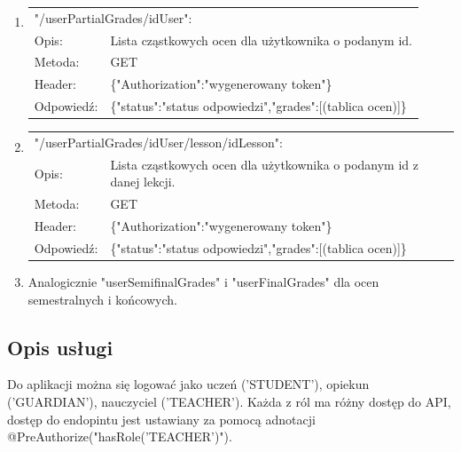 \documentclass[12pt, titlepage]{article}
\begin{document}
\begin{enumerate}
	\item 
	{\renewcommand{\arraystretch}{1.5}
	\begin{tabular}[t]{p{3cm} p{15cm}}
	\multicolumn{2}{l}{"/userPartialGrades/{idUser}":} \\
	Opis: &  Lista cząstkowych ocen dla użytkownika o podanym id. \\
	Metoda: & GET \\
	Header: & \{"Authorization":"wygenerowany token"\} \\
	Odpowiedź: & \{"status":"status odpowiedzi",\newline "grades":[(tablica ocen)]\}
	\end{tabular}}
	
	\item 
	{\renewcommand{\arraystretch}{1.5}
	\begin{tabular}[t]{p{3cm} p{15cm}}
	\multicolumn{2}{l}{"/userPartialGrades/{idUser}/lesson/{idLesson}":} \\
	Opis: &  Lista cząstkowych ocen dla użytkownika o podanym id z danej lekcji. \\
	Metoda: & GET \\
	Header: & \{"Authorization":"wygenerowany token"\} \\
	Odpowiedź: & \{"status":"status odpowiedzi",\newline "grades":[(tablica ocen)]\}
	\end{tabular}}
	
	\item Analogicznie "userSemifinalGrades" i "userFinalGrades" dla ocen semestralnych i końcowych.
\end{enumerate}

\subsection{Opis usługi}

Do aplikacji można się logować jako uczeń ('STUDENT'), opiekun ('GUARDIAN'), nauczyciel ('TEACHER'). Każda z ról ma różny dostęp do API, dostęp do endopintu jest ustawiany za pomocą adnotacji @PreAuthorize("hasRole('TEACHER')").
\end{document}
